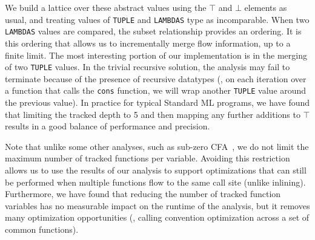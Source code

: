 We build a lattice over these abstract values using the $\top$ and $\bot$ 
elements as usual, and treating values of \lstinline{TUPLE} and 
\lstinline{LAMBDAS} type as incomparable.
When two \lstinline{LAMBDAS} values are compared, the subset relationship 
provides an ordering.
It is this ordering that allows us to incrementally merge flow information, up
to a finite limit.
The most interesting portion of our implementation is in the merging of
two \lstinline{TUPLE} values.
In the trivial recursive solution, the analysis may fail to terminate because of
the presence of recursive datatypes (\eg{}, on each iteration over a function
that calls the \lstinline{cons} function, we will wrap another \lstinline{TUPLE}
value around the previous value).
In practice for typical Standard ML programs, we have found that limiting the
tracked depth to 5 and then mapping any further additions to $\top$
results in a good balance of performance and precision.

Note that unlike some other analyses, such as sub-zero CFA~\cite{sub-zero-cfa}, we do not limit the
maximum number of tracked functions per variable.
Avoiding this restriction allows us to use the results of our analysis to support
optimizations that can still be performed when multiple functions flow
to the same call site (unlike inlining).
Furthermore, we have found that reducing the number of tracked function variables has no measurable
impact on the runtime of the analysis, but it removes many optimization 
opportunities (\eg, calling convention optimization across a set of common functions).

